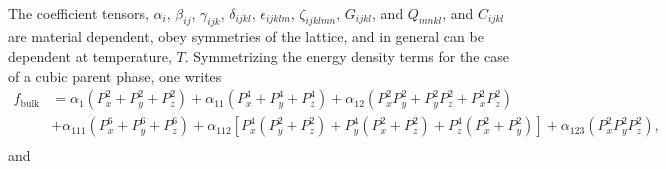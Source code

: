 \documentclass[22pt]{article} %
\begin{document}
\paragraph{}The coefficient tensors, $\alpha_{i}$, $\beta_{ij}$, $\gamma_{ijk}$, $\delta_{ijkl}$, $\epsilon_{ijklm}$, $\zeta_{ijklmn}$, $G_{ijkl}$, and $Q_{mnkl}$,  and $C_{ijkl}$ are material dependent, obey symmetries of the lattice, and in general can be dependent at temperature, $T$.
%
Symmetrizing the energy density terms for the case of a cubic parent phase, one writes
%
\begin{align}\nonumber
f_\mathrm{bulk} &= \alpha_1 \left(P_x^2 + P_y^2 + P_z^2 \right) + \alpha_{11} \left(P_x^4 + P_y^4 + P_z^4 \right) + \alpha_{12} \left(P_x^2 P_y^2 + P_y^2 P_z^2 + P_x^2 P_z^2 \right) \\ \nonumber
&+ \alpha_{111} \left(P_x^6 + P_y^6 + P_z^6 \right) + \alpha_{112} \left[P_x^4 \left(P_y^2 + P_z^2 \right) + P_y^4 \left(P_x^2 + P_z^2 \right) + P_z^4 \left(P_x^2 + P_y^2 \right) \right] + \alpha_{123} \left(P_x^2 P_y^2 P_z^2 \right), \\ \nonumber
\end{align}
%
and
%
\end{document}
